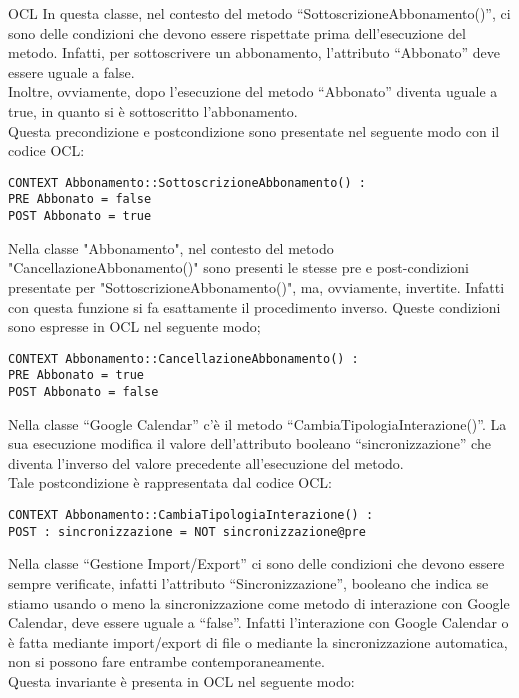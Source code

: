 \begin{listaPersonale}{OCL}
    In questa classe, nel contesto del metodo “SottoscrizioneAbbonamento()”, ci sono delle condizioni che devono essere rispettate prima dell’esecuzione del metodo. Infatti, per sottoscrivere un abbonamento, l’attributo “Abbonato” deve essere uguale a false.\\
    Inoltre, ovviamente, dopo l’esecuzione del metodo “Abbonato” diventa uguale a true, in quanto si è sottoscritto l’abbonamento.\\
    Questa precondizione e postcondizione sono presentate nel seguente modo con il codice OCL:

    \begin{lstlisting}
CONTEXT Abbonamento::SottoscrizioneAbbonamento() :
PRE Abbonato = false
POST Abbonato = true
    \end{lstlisting}
    Nella classe "Abbonamento", nel contesto del metodo "CancellazioneAbbonamento()" sono presenti le stesse pre e post-condizioni presentate per "SottoscrizioneAbbonamento()", ma, ovviamente, invertite. Infatti con questa funzione si fa esattamente il procedimento inverso.
    Queste condizioni sono espresse in OCL nel seguente modo;
    \begin{lstlisting}
CONTEXT Abbonamento::CancellazioneAbbonamento() :
PRE Abbonato = true
POST Abbonato = false
    \end{lstlisting}




    Nella classe “Google Calendar” c'è il metodo “CambiaTipologiaInterazione()”. La sua esecuzione modifica il valore dell'attributo booleano “sincronizzazione” che diventa l'inverso del valore precedente all'esecuzione del metodo.\\
    Tale postcondizione è rappresentata dal codice OCL:
    \begin{lstlisting}
CONTEXT Abbonamento::CambiaTipologiaInterazione() :
POST : sincronizzazione = NOT sincronizzazione@pre 
    \end{lstlisting}




    Nella classe “Gestione Import/Export” ci sono delle condizioni che devono essere sempre verificate, infatti l’attributo “Sincronizzazione”, booleano che indica se stiamo usando  o meno la sincronizzazione come metodo di interazione con Google Calendar, deve essere uguale a “false”. Infatti l’interazione con Google Calendar o è fatta mediante import/export di file o mediante la sincronizzazione automatica, non si possono fare entrambe contemporaneamente.\\
    Questa invariante è presenta in OCL nel seguente modo:


\end{listaPersonale}

